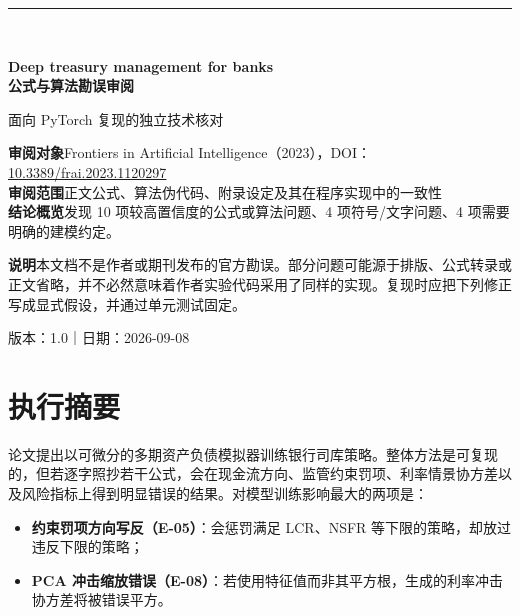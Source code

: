 \documentclass[UTF8,11pt,a4paper,fontset=fandol]{ctexart}
\begin{document}
\begin{titlepage}
  \thispagestyle{empty}
  \vspace*{18mm}
  {\color{blue}\rule{24mm}{2.2pt}}\\[9mm]
  {\fontsize{24}{30}\selectfont\bfseries\color{navy}
    Deep treasury management for banks\\[3mm]
    公式与算法勘误审阅\par}
  \vspace{8mm}
  {\Large\color{gray}面向 PyTorch 复现的独立技术核对}

  \vfill
  \begin{summarybox}
  \textbf{审阅对象}\quad Frontiers in Artificial Intelligence（2023），DOI：
  \href{https://doi.org/10.3389/frai.2023.1120297}{10.3389/frai.2023.1120297}\\
  \textbf{审阅范围}\quad 正文公式、算法伪代码、附录设定及其在程序实现中的一致性\\
  \textbf{结论概览}\quad 发现 10 项较高置信度的公式或算法问题、4 项符号/文字问题、4 项需要明确的建模约定。
  \end{summarybox}

  \vspace{7mm}
  \begin{warningbox}
  \textbf{说明}\quad 本文档不是作者或期刊发布的官方勘误。部分问题可能源于排版、公式转录或正文省略，并不必然意味着作者实验代码采用了同样的实现。复现时应把下列修正写成显式假设，并通过单元测试固定。
  \end{warningbox}

  \vfill
  {\color{gray}\small 版本：1.0\quad｜\quad 日期：2026-09-08}
\end{titlepage}

\tableofcontents
\clearpage

\section{执行摘要}

论文提出以可微分的多期资产负债模拟器训练银行司库策略。整体方法是可复现的，但若逐字照抄若干公式，会在现金流方向、监管约束罚项、利率情景协方差以及风险指标上得到明显错误的结果。对模型训练影响最大的两项是：

\begin{itemize}
  \item \textbf{约束罚项方向写反（E-05）}：会惩罚满足 LCR、NSFR 等下限的策略，却放过违反下限的策略；
  \item \textbf{PCA 冲击缩放错误（E-08）}：若使用特征值而非其平方根，生成的利率冲击协方差将被错误平方。
\end{itemize}
\end{document}
